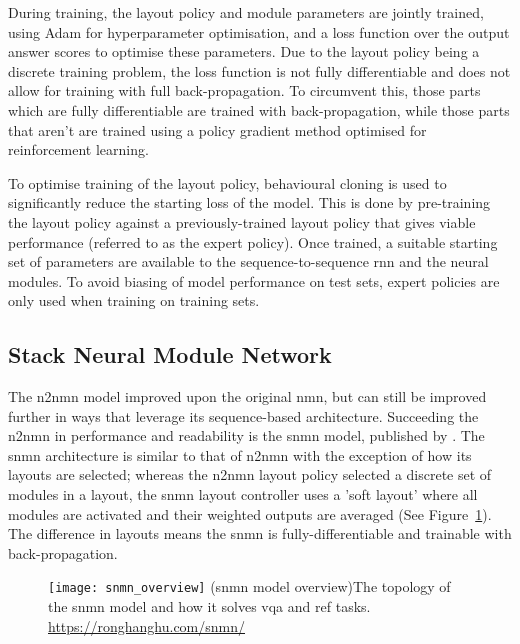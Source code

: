 During training, the layout policy and module parameters are jointly trained, using Adam for hyperparameter optimisation\cite{kingma_adam_2017}, and a loss function over the output answer scores to optimise these parameters.
Due to the layout policy being a discrete training problem, the loss function is not fully differentiable and does not allow for training with full back-propagation.
To circumvent this, those parts which are fully differentiable are trained with back-propagation, while those parts that aren't are trained using a policy gradient method optimised for reinforcement learning.

To optimise training of the layout policy, behavioural cloning is used to significantly reduce the starting loss of the model.
This is done by pre-training the layout policy against a previously-trained layout policy that gives viable performance (referred to as the expert policy).
Once trained, a suitable starting set of parameters are available to the sequence-to-sequence \gls{rnn} and the neural modules.
To avoid biasing of model performance on test sets, expert policies are only used when training on training sets.

\clearpage
\subsection{Stack Neural Module Network}
\label{subsec:stack_neural_module_network}

The \gls{n2nmn} model improved upon the original \gls{nmn}, but can still be improved further in ways that leverage its sequence-based architecture.
Succeeding the \gls{n2nmn} in performance and readability is the \gls{snmn} model, published by \citeauthor{hu_explainable_2019}\cite{hu_explainable_2019}.
The \gls{snmn} architecture is similar to that of \gls{n2nmn} with the exception of how its layouts are selected; whereas the \gls{n2nmn} layout policy selected a discrete set of modules in a layout, the \gls{snmn} layout controller uses a 'soft layout' where all modules are activated and their weighted outputs are averaged (See Figure~\ref{fig:snmn_overview}). The difference in layouts means the \gls{snmn} is fully-differentiable and trainable with back-propagation.

\begin{figure}[htbp]
    \centering
    \texttt{[image: snmn\_overview]}
    \captionsource(\acrshort{snmn} model overview){The topology of the \acrshort{snmn} model and how it solves \acrshort{vqa} and \acrshort{ref} tasks. \label{fig:snmn_overview}}{\url{https://ronghanghu.com/snmn/}}
\end{figure}

